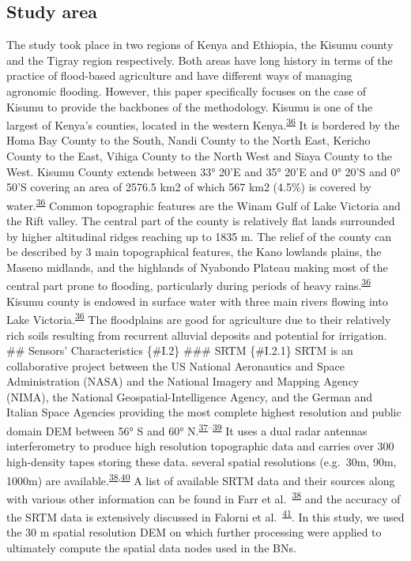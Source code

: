 \documentclass[12pt,oneside]{article}
\begin{document}
\hypertarget{I.1}{%
\subsection{Study area}\label{I.1}}

The study took place in two regions of Kenya and Ethiopia, the Kisumu
county and the Tigray region respectively. Both areas have long history
in terms of the practice of flood-based agriculture and have different
ways of managing agronomic flooding. However, this paper specifically
focuses on the case of Kisumu to provide the backbones of the
methodology. Kisumu is one of the largest of Kenya's counties, located
in the western
Kenya.\textsuperscript{\protect\hyperlink{ref-KisumuCountyGovernment_2013}{36}}
It is bordered by the Homa Bay County to the South, Nandi County to the
North East, Kericho County to the East, Vihiga County to the North West
and Siaya County to the West. Kisumu County extends between 33° 20'E and
35° 20'E and 0° 20'S and 0° 50'S covering an area of 2576.5 km2 of which
567 km2 (4.5\%) is covered by
water.\textsuperscript{\protect\hyperlink{ref-KisumuCountyGovernment_2013}{36}}
Common topographic features are the Winam Gulf of Lake Victoria and the
Rift valley. The central part of the county is relatively flat lands
surrounded by higher altitudinal ridges reaching up to 1835 m. The
relief of the county can be described by 3 main topographical features,
the Kano lowlands plains, the Maseno midlands, and the highlands of
Nyabondo Plateau making most of the central part prone to flooding,
particularly during periods of heavy
rains.\textsuperscript{\protect\hyperlink{ref-KisumuCountyGovernment_2013}{36}}
Kisumu county is endowed in surface water with three main rivers flowing
into Lake
Victoria.\textsuperscript{\protect\hyperlink{ref-KisumuCountyGovernment_2013}{36}}
The floodplains are good for agriculture due to their relatively rich
soils resulting from recurrent alluvial deposits and potential for
irrigation. \#\# Sensors' Characteristics \{\#I.2\} \#\#\# SRTM
\{\#I.2.1\} SRTM is an collaborative project between the US National
Aeronautics and Space Administration (NASA) and the National Imagery and
Mapping Agency (NIMA), the National Geospatial-Intelligence Agency, and
the German and Italian Space Agencies providing the most complete
highest resolution and public domain DEM between 56° S and 60°
N.\textsuperscript{\protect\hyperlink{ref-Farr_et_al_2000}{37}--\protect\hyperlink{ref-Nikolakopoulos_et_al_2006}{39}}
It uses a dual radar antennas interferometry to produce high resolution
topographic data and carries over 300 high-density tapes storing these
data. several spatial resolutions (e.g.~30m, 90m, 1000m) are
available.\textsuperscript{\protect\hyperlink{ref-Farr_et_al_2007}{38},\protect\hyperlink{ref-Jarvis_et_al_2008}{40}}
A list of available SRTM data and their sources along with various other
information can be found in Farr et
al.~\textsuperscript{\protect\hyperlink{ref-Farr_et_al_2007}{38}} and
the accuracy of the SRTM data is extensively discussed in Falorni et
al.~\textsuperscript{\protect\hyperlink{ref-Falorni_et_al_2005}{41}}. In
this study, we used the 30 m spatial resolution DEM on which further
processing were applied to ultimately compute the spatial data nodes
used in the BNs.
\end{document}
